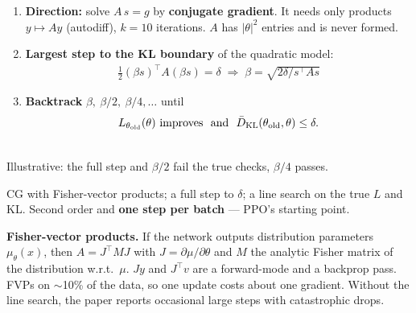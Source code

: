 \begin{minipage}[c]{0.54\linewidth}
\begin{enumerate}
  \item \textbf{Direction:} solve $A\,s=g$ by \textbf{conjugate gradient}. It needs only products $y\mapsto Ay$ (autodiff), $k=10$ iterations. $A$ has $|\theta|^2$ entries and is never formed.
  \item \textbf{Largest step to the KL boundary} of the quadratic model:
  \begin{gather*}
    \tfrac12(\beta s)^\top A(\beta s)=\delta \;\Rightarrow\; \beta=\sqrt{2\delta/s^\top A s}
  \end{gather*}
  \item \textbf{Backtrack} $\beta,\ \beta/2,\ \beta/4,\dots$ until
  \begin{gather*}
    L_{\theta_{\mathrm{old}}}(\theta)\ \text{improves} \ \ \text{and}\ \ \bar D_{\mathrm{KL}}(\theta_{\mathrm{old}},\theta)\le\delta.
  \end{gather*}
\end{enumerate}
\end{minipage}\hfill
\begin{minipage}[c]{0.42\linewidth}
\centering
{}\\
{\scriptsize Illustrative: the full step and $\beta/2$ fail the true checks, $\beta/4$ passes.}
\end{minipage}

     {CG with Fisher-vector products; a full step to $\delta$; a line search on the true $L$ and KL.}
     {Second order and \textbf{one step per batch} --- PPO's starting point.}

\begin{notebox}
\textbf{Fisher-vector products.} If the network outputs distribution parameters $\mu_\theta(x)$, then $A=J^\top MJ$ with $J=\partial\mu/\partial\theta$ and $M$ the analytic Fisher matrix of the distribution w.r.t.\ $\mu$. $Jy$ and $J^\top v$ are a forward-mode and a backprop pass. FVPs on $\sim$10\% of the data, so one update costs about one gradient. Without the line search, the paper reports occasional large steps with catastrophic drops.
\end{notebox}

